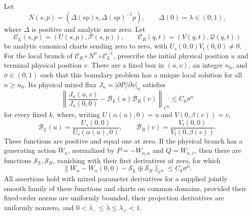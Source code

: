 \begin{proposition}
\label{prop:v14-normal-form}
Let
\begin{equation}\label{eq:v14-normal-map}
 N(s,p)=(\Delta(sp)s,\Delta(sp)^{-1}p),\qquad
 \Delta(0)=\lambda\in(0,1),
\end{equation}
where $\Delta$ is positive and analytic near zero. Let
\[
 \mathcal C_L(s,p)=(U(s,p),\mathcal P(s,p)),\qquad
 \mathcal C_R(q,t)=(V(q,t),\mathcal Q(q,t))
\]
be analytic canonical charts sending zero to zero, with
$U_s(0,0)V_t(0,0)\ne0$. For the local branch of
$\mathcal C_R\circ N^n\circ\mathcal C_L^{-1}$, prescribe the initial
physical position $u$ and terminal physical position $v$. There are a
fixed box in $(u,v)$, an integer $n_0$, and $\sigma\in(0,1)$ such that
this boundary problem has a unique local solution for all $n\ge n_0$.
Its physical mixed flux $J_n=|\partial P/\partial v|_u$ satisfies
\begin{equation}\label{eq:v14-normal-relative}
 \left\|\frac{J_n(u,v)}{J_n(0,0)}
                  -\mathcal B_L(u)\mathcal B_R(v)\right\|_{C^k}
                       \le C_k\sigma^n
\end{equation}
for every fixed $k$, where, writing
$U(\alpha(u),0)=u$ and $V(0,\beta(v))=v$,
\begin{equation}\label{eq:v14-projection-factors}
 \mathcal B_L(u)=\frac{U_s(0,0)}{U_s(\alpha(u),0)},\qquad
 \mathcal B_R(v)=\frac{V_t(0,0)}{V_t(0,\beta(v))}.
\end{equation}
These functions are positive and equal one at zero. If the physical
branch has a generating action $W_n$, normalized by
$P=-W_{n,u}$ and $Q=W_{n,v}$, then there are functions
$\mathcal S_L,\mathcal S_R$, vanishing with their first derivatives
at zero, for which
\begin{equation}\label{eq:v14-normal-action}
 \|W_n-W_n(0,0)-\mathcal S_L\oplus\mathcal S_R\|_{C^k}
                                                    \le C_k\sigma^n.
\end{equation}
All assertions hold with mixed parameter derivatives for a supplied
jointly smooth family of these functions and charts on common domains,
provided their fixed-order norms are uniformly bounded, their projection
derivatives are uniformly nonzero, and
$0<\lambda_-\le\lambda\le\lambda_+<1$.
\end{proposition}

